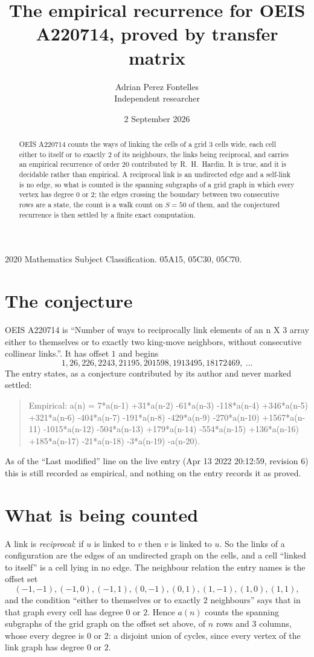 \documentclass[11pt,a4paper]{article}
\title{The empirical recurrence for OEIS A220714, proved by transfer matrix}
\author{Adrian Perez Fontelles\\ \small Independent researcher}
\date{2 September 2026}
\theoremstyle{plain}
\theoremstyle{definition}
\begin{document}
\maketitle

\begin{abstract}
OEIS A220714 counts the ways of linking the cells of a grid $3$ cells wide, each cell either to
itself or to exactly $2$ of its neighbours, the links being reciprocal, and carries an
empirical recurrence of order $20$ contributed by R.~H.~Hardin. It is true, and it is
decidable rather than empirical. A reciprocal link is an undirected edge and a self-link is
no edge, so what is counted is the spanning subgraphs of a grid graph in which every vertex
has degree $0$ or $2$; the edges crossing the boundary between two consecutive rows are a
state, the count is a walk count on $S=50$ of them, and the conjectured recurrence is then
settled by a finite exact computation.
\end{abstract}

\noindent\small 2020 Mathematics Subject Classification. 05A15, 05C30, 05C70.\normalsize

\section{The conjecture}

OEIS A220714 is ``Number of ways to reciprocally link elements of an n X 3 array either to themselves or to exactly two king-move neighbors, without consecutive collinear links.''. It has offset $1$ and begins
\[
1, 26, 226, 2243, 21195, 201598, 1913495, 18172469,\ \dots
\]
The entry states, as a conjecture contributed by its author and never marked settled:
\begin{quote}
Empirical: a(n) = 7*a(n-1) +31*a(n-2) -61*a(n-3) -118*a(n-4) +346*a(n-5) +321*a(n-6) -404*a(n-7) -191*a(n-8) -429*a(n-9) -270*a(n-10) +1567*a(n-11) -1015*a(n-12) -504*a(n-13) +179*a(n-14) -554*a(n-15) +136*a(n-16) +185*a(n-17) -21*a(n-18) -3*a(n-19) -a(n-20).
\end{quote}
As of the ``Last modified'' line on the live entry (Apr 13 2022 20:12:59, revision 6) this is still
recorded as empirical, and nothing on the entry records it as proved.

\section{What is being counted}

A link is \emph{reciprocal}: if $u$ is linked to $v$ then $v$ is linked to $u$. So the links
of a configuration are the edges of an undirected graph on the cells, and a cell ``linked to
itself'' is a cell lying in no edge. The neighbour relation the entry names is the offset set
\[
(-1,-1), (-1,0), (-1,1), (0,-1), (0,1), (1,-1), (1,0), (1,1),
\]
and the condition ``either to themselves or to exactly $2$ neighbours'' says that in that
graph every cell has degree $0$ or $2$. Hence $a(n)$ counts the spanning subgraphs of the
grid graph on the offset set above, of $n$ rows and $3$ columns,
whose every degree is $0$ or $2$: a disjoint union of cycles, since every vertex of the link graph has degree $0$ or $2$.
\end{document}
